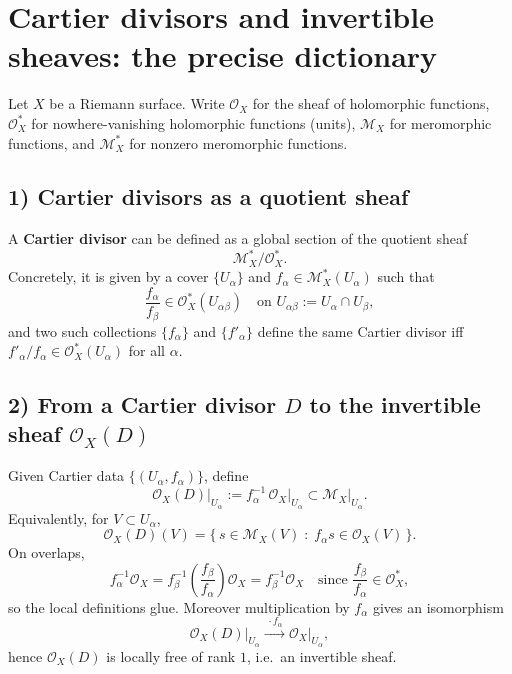 \documentclass[11pt,openany]{article}
\renewcommand{\emph}[1]{\textbf{#1}}
\begin{document}
\newpage

\section{Cartier divisors and invertible sheaves: the precise dictionary}

Let $X$ be a Riemann surface.
Write $\mathcal O_X$ for the sheaf of holomorphic functions,
$\mathcal O_X^*$ for nowhere-vanishing holomorphic functions (units),
$\mathcal M_X$ for meromorphic functions, and $\mathcal M_X^*$ for nonzero meromorphic functions.

\subsection*{1) Cartier divisors as a quotient sheaf}
A \emph{Cartier divisor} can be defined as a global section of the quotient sheaf
\[
\mathcal M_X^*/\mathcal O_X^*.
\]
Concretely, it is given by a cover $\{U_\alpha\}$ and $f_\alpha\in \mathcal M_X^*(U_\alpha)$ such that
\[
\frac{f_\alpha}{f_\beta}\in \mathcal O_X^*(U_{\alpha\beta})
\quad\text{on }U_{\alpha\beta}:=U_\alpha\cap U_\beta,
\]
and two such collections $\{f_\alpha\}$ and $\{f'_\alpha\}$ define the same Cartier divisor iff
$f'_\alpha/f_\alpha\in \mathcal O_X^*(U_\alpha)$ for all $\alpha$.

\subsection*{2) From a Cartier divisor $D$ to the invertible sheaf $\mathcal O_X(D)$}
Given Cartier data $\{(U_\alpha,f_\alpha)\}$, define
\[
\mathcal O_X(D)\big|_{U_\alpha}:= f_\alpha^{-1}\,\mathcal O_X\big|_{U_\alpha}\subset \mathcal M_X\big|_{U_\alpha}.
\]
Equivalently, for $V\subset U_\alpha$,
\[
\mathcal O_X(D)(V)=\{\, s\in \mathcal M_X(V)\;:\; f_\alpha s\in \mathcal O_X(V)\,\}.
\]
On overlaps,
\[
f_\alpha^{-1}\mathcal O_X
=
f_\beta^{-1}\left(\frac{f_\beta}{f_\alpha}\right)\mathcal O_X
=
f_\beta^{-1}\mathcal O_X
\quad\text{since }\frac{f_\beta}{f_\alpha}\in \mathcal O_X^*,
\]
so the local definitions glue. Moreover multiplication by $f_\alpha$ gives an isomorphism
\[
\mathcal O_X(D)\big|_{U_\alpha}\xrightarrow{\ \cdot f_\alpha\ }\mathcal O_X\big|_{U_\alpha},
\]
hence $\mathcal O_X(D)$ is locally free of rank $1$, i.e.\ an invertible sheaf.
\end{document}

